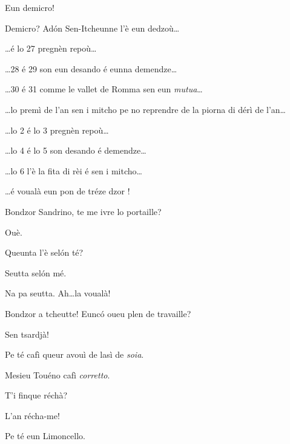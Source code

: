 \begin{drama}
\Saventaspeaks{} Eun demicro!

\Tuenospeaks Demicro? Ad\'on Sen-Itcheunne l'è eun dedzoù\ldots

\Richardspeaks \ldots é lo 27 pregnèn repoù\ldots

\Gerominespeaks \ldots 28 é 29 son eun desando é eunna demendze\ldots

\Saventaspeaks \ldots 30 é 31 comme le vallet de Romma sen eun \textit{mutua}\ldots

\Spritzspeaks \ldots lo premì de l’an sen i mitcho pe no reprendre de la piorna di dérì de l'an\ldots

\Tuenospeaks \ldots lo 2 é lo 3 pregnèn repoù\ldots

\Richardspeaks \ldots lo 4 é lo 5 son desando é demendze\ldots

\Gerominespeaks \ldots lo 6 l'è la fita di rèi é sen i mitcho\ldots

\Tcheuttespeaks \ldots é voualà eun pon de tréze dzor \fita!


\Baristaspeaks Bondzor Sandrino, te me ivre lo portaille?

\Sandrinospeaks Ouè.


\Sandrinospeaks{} Queunta l'è sel\'on té?

\Baristaspeaks{} Seutta sel\'on mé.

\Sandrinospeaks Na pa seutta. Ah\ldots la voualà!


\Baristaspeaks Bondzor a tcheutte! Eunc\'o oueu plen de travaille?

\Gerominespeaks Sen tsardjà!


\Baristaspeaks{} Pe té cafì queur avouì de lasì de \textit{soia}.

\Baristaspeaks{} Mesieu Touéno cafì \textit{corretto}.

\Baristaspeaks{} T'i finque réchà? 

\Spritzspeaks L'an récha-me!

\Baristaspeaks Pe té eun Limoncello.


\end{drama}
